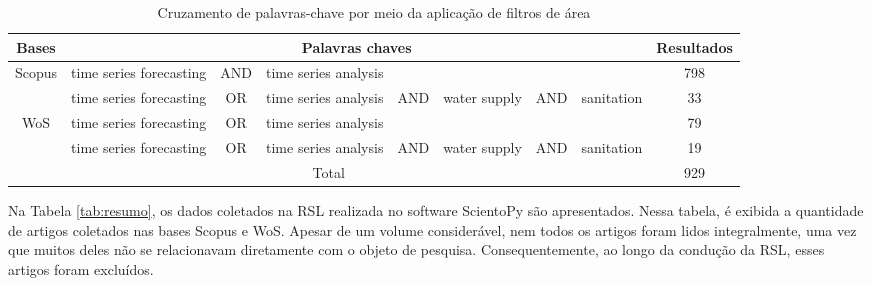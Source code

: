 \begin{table}[tb]
	\centering
	\caption{Cruzamento de palavras-chave por meio da aplicação de filtros de área}\label{tb1}
	\begin{tabular}{@{}cp{2cm}cp{2cm}cp{1.5cm}cp{2cm}c@{}}
			\toprule
			Bases                   & \multicolumn{7}{c}{Palavras chaves}                                                          & Resultados \\ \midrule
			\multirow{2}{*}{Scopus} & time series forecasting & AND & time series analysis &     &              &     &            & 798        \\
			& time series forecasting & OR  & time series analysis & AND & water supply & AND & sanitation & 33         \\
			\multirow{2}{*}{WoS}    & time series forecasting & OR  & time series analysis &     &              &     &            & 79         \\
			& time series forecasting & OR  & time series analysis & AND & water supply & AND & sanitation & 19         \\ \hline
			\multicolumn{8}{c}{Total}                                                                                              & 929        \\ \bottomrule
		\end{tabular}
	
	
\end{table}



Na Tabela \ref{tab:resumo}, os dados coletados na RSL realizada no software ScientoPy  são apresentados. Nessa tabela, é exibida a quantidade de artigos coletados nas bases Scopus e WoS. Apesar de um volume considerável, nem todos os artigos foram lidos integralmente, uma vez que muitos deles não se relacionavam diretamente com o objeto de pesquisa. Consequentemente, ao longo da condução da RSL, esses artigos foram excluídos.

